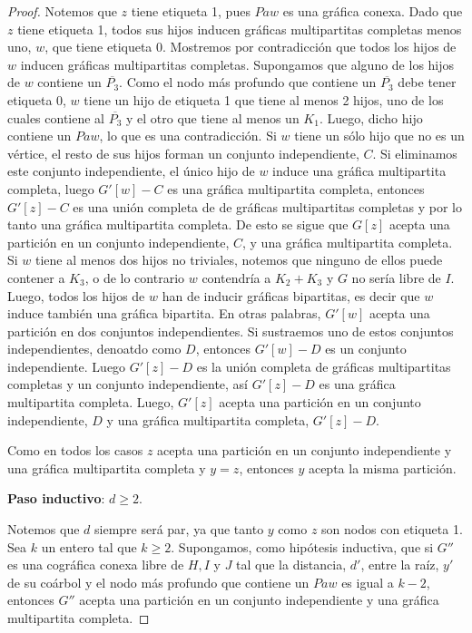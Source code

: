 \begin{proof}
    Notemos que $z$ tiene etiqueta 1, pues $Paw$ es una gráfica conexa. Dado que $z$ tiene etiqueta 1, todos sus hijos inducen gráficas multipartitas completas menos uno, $w$, que tiene etiqueta 0. Mostremos por contradicción que todos los hijos de $w$ inducen gráficas multipartitas completas. Supongamos que alguno de los hijos de $w$ contiene un $\overline{P_3}$. Como el nodo más profundo que contiene un $\overline{P_3}$ debe tener etiqueta 0, $w$ tiene un hijo de etiqueta 1 que tiene al menos 2 hijos, uno de los cuales contiene al $\overline{P_3}$ y el otro que tiene al menos un $K_1$. Luego, dicho hijo contiene un $Paw$, lo que es una contradicción. Si $w$ tiene un sólo hijo que no es un vértice, el resto de sus hijos forman un conjunto independiente, $C$. Si eliminamos este conjunto independiente, el único hijo de $w$ induce una gráfica multipartita completa, luego $G'[w] - C$ es una gráfica multipartita completa, entonces $G'[z] - C$ es una unión completa de de gráficas multipartitas completas y por lo tanto una gráfica multipartita completa. De esto se sigue que $G[z]$ acepta una partición en un conjunto independiente, $C$, y una gráfica multipartita completa. Si $w$ tiene al menos dos hijos no triviales, notemos que ninguno de ellos puede contener a $K_3$, o de lo contrario $w$ contendría a $K_2+K_3$ y $G$ no sería libre de $I$. Luego, todos los hijos de $w$ han de inducir gráficas bipartitas, es decir que $w$ induce también una gráfica bipartita. En otras palabras, $G'[w]$ acepta una partición en dos conjuntos independientes. Si sustraemos uno de estos conjuntos independientes, denoatdo como $D$, entonces $G'[w]-D$ es un conjunto independiente. Luego $G'[z]-D$ es la unión completa de gráficas multipartitas completas y un conjunto independiente, así $G'[z]-D$ es una gráfica multipartita completa. Luego, $G'[z]$ acepta una partición en un conjunto independiente, $D$ y una gráfica multipartita completa, $G'[z] - D$. 
    
    Como en todos los casos $z$ acepta una partición en un conjunto independiente y una gráfica multipartita completa y $y = z$, entonces $y$ acepta la misma partición.
    
    \textbf{Paso inductivo}: $d \geq 2$.
    
    Notemos que $d$ siempre será par, ya que tanto $y$ como $z$ son nodos con etiqueta 1. Sea $k$ un entero tal que $k \geq 2$. Supongamos, como hipótesis inductiva, que si $G''$ es una cográfica conexa libre de $H, I$ y $J$ tal que la distancia, $d'$, entre la raíz, $y'$ de su coárbol y el nodo más profundo que contiene un $Paw$ es igual a $k-2$, entonces $G''$ acepta una partición en un conjunto independiente y una gráfica multipartita completa.
    

\end{proof}
